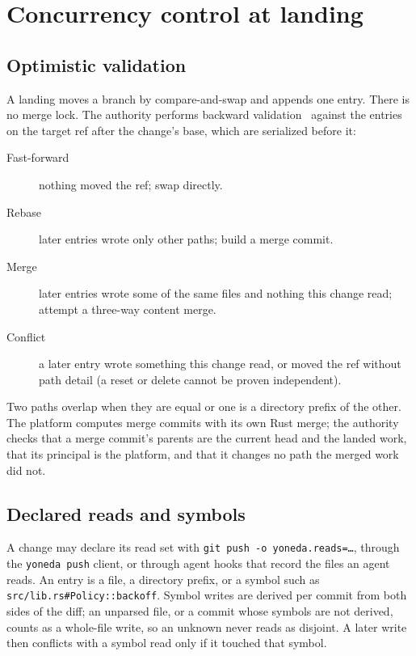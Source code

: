 \documentclass[11pt]{article}
\newcommand{\code}[1]{\texttt{#1}}
\begin{document}
\section{Concurrency control at landing}
\label{sec:landing}

\subsection{Optimistic validation}

A landing moves a branch by compare-and-swap and appends one entry. There is no merge
lock. The authority performs backward validation~\cite{kung1981occ} against the entries
on the target ref after the change's base, which are serialized before it:

\begin{description}
\item[Fast-forward] nothing moved the ref; swap directly.
\item[Rebase] later entries wrote only other paths; build a merge commit.
\item[Merge] later entries wrote some of the same files and nothing this change read;
  attempt a three-way content merge.
\item[Conflict] a later entry wrote something this change read, or moved the ref
  without path detail (a reset or delete cannot be proven independent).
\end{description}

Two paths overlap when they are equal or one is a directory prefix of the other. The
platform computes merge commits with its own Rust merge; the authority checks that a
merge commit's parents are the current head and the landed work, that its principal is
the platform, and that it changes no path the merged work did not.

\subsection{Declared reads and symbols}

A change may declare its read set with \code{git push -o yoneda.reads=\ldots}, through
the \code{yoneda push} client, or through agent hooks that record the files an agent
reads. An entry is a file, a directory prefix, or a symbol such as
\code{src/lib.rs\#Policy::backoff}. Symbol writes are derived per commit from both sides
of the diff; an unparsed file, or a commit whose symbols are not derived, counts as a
whole-file write, so an unknown never reads as disjoint. A later write then conflicts
with a symbol read only if it touched that symbol.
\end{document}
